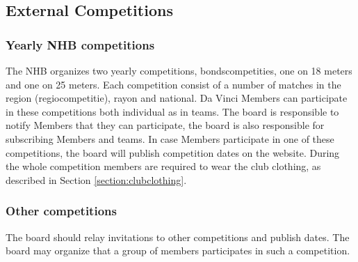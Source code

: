 \documentclass[a4paper]{article}
\begin{document}
\subsection{External Competitions}
\subsubsection{Yearly NHB competitions}
The NHB organizes two yearly competitions, bondscompetities, one on 18 meters and one on 25 meters. Each competition consist of a number of matches in the region (regiocompetitie), rayon and national. Da Vinci Members can participate in these competitions both individual as in teams. The board is responsible to notify Members that they can participate, the board is also responsible for subscribing Members and teams. In case Members participate in one of these competitions, the board will publish competition dates on the website. During the whole competition members are required to wear the club clothing, as described in Section \ref{section:clubclothing}.

\subsubsection{Other competitions}
The board should relay invitations to other competitions and publish dates. The board may organize that a group of members participates in such a competition.
\end{document}
